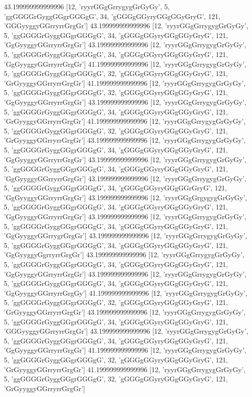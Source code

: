 43.199999999999996 [12, 'ryyrGGgGrrygygGrGyGy', 5, 'ggGGGGrGyggGGgrGGGgG', 34, 'gGGGgGGyryGGgGGyGryG', 121, 'GGGyyggyGGrryrrGrgGr']
43.199999999999996 [12, 'ryyrGGgGrrygygGrGyGy', 5, 'ggGGGGrGyggGGgrGGGgG', 34, 'gGGGgGGyryGGgGGyGryG', 121, 'GgGyyggyGGrryrrGrgGr']
43.199999999999996 [12, 'ryyrGGgGrrygygGrGyGy', 5, 'ggGGGGrGyggGGgrGGGgG', 34, 'gGGGgGGyryGGgGGyGryG', 121, 'GgGyyggyGGrryrrGrgGr']
41.199999999999996 [12, 'ryyrGGgGrrygygGrGyGy', 5, 'ggGGGGrGyggGGgrGGGgG', 32, 'gGGGgGGyryGGgGGyGryG', 121, 'GrGyyggyGGrryrrGrgGr']
41.199999999999996 [12, 'ryyrGGgGrrygygGrGyGy', 5, 'ggGGGGrGyggGGgrGGGgG', 32, 'gGGGgGGyryGGgGGyGryG', 121, 'GgGyyggyGGrryrrGrgGr']
43.199999999999996 [12, 'ryyrGGgGrrygygGrGyGy', 5, 'ggGGGGrGyggGGgrGGGgG', 34, 'gGGGgGGyryGGgGGyGryG', 121, 'GrGyyggyGGrryrrGrgGr']
41.199999999999996 [12, 'ryyrGGgGrrygygGrGyGy', 5, 'ggGGGGrGyggGGgrGGGgG', 32, 'gGGGgGGyryGGgGGyGryG', 121, 'GrGyyggyGGrryrrGrgGr']
43.199999999999996 [12, 'ryyrGGgGrrygygGrGyGy', 5, 'ggGGGGrGyggGGgrGGGgG', 34, 'gGGGgGGyryGGgGGyGryG', 121, 'GgGyyggyGGrryrrGrgGr']
43.199999999999996 [12, 'ryyrGGgGrrygygGrGyGy', 5, 'ggGGGGrGyggGGgrGGGgG', 34, 'gGGGgGGyryGGgGGyGryG', 121, 'GgGyyggyGGrryrrGrgGr']
43.199999999999996 [12, 'ryyrGGgGrrygygGrGyGy', 5, 'ggGGGGrGyggGGgrGGGgG', 34, 'gGGGgGGyryGGgGGrGryG', 121, 'GgGyyggyGGrryrrGrgGr']
43.199999999999996 [12, 'ryyrGGgGrgygygGrGyGy', 5, 'ggGGGGrGyggGGgrGGGgG', 34, 'gGGGgGGyryGGgGGyGryG', 121, 'GgGyyggyGGrryrrGrgGr']
43.199999999999996 [12, 'ryyrGGgGrrygygGrGyGy', 5, 'ggGGGGrGyggGGgrGGGgG', 34, 'gGGGgGGyryGGgGGyGryG', 121, 'GgGyyggyGGrrygrGrgGr']
43.199999999999996 [12, 'ryyrGGgGrrygygGrGyGy', 5, 'ggGGGGrGyggGGgrGGGgG', 34, 'gGGGgGGyryGGgGGyGryG', 121, 'GgGyyggyGgrryrrGrgGr']
43.199999999999996 [12, 'ryyrGGgGrrygygGrGyGy', 5, 'ggGGGGrGyggGGgrGGGgG', 34, 'gGGGgGGyryGGgGGyGryG', 121, 'GgGyyggyGGrryrrGrgGr']
43.199999999999996 [12, 'ryyrGGgGrrygygGrGyGy', 5, 'ggGGGGrGyggGGgrGGGgG', 34, 'gGGGgGGyryGGgGGyGryG', 121, 'GgGyyggyGGrryrrGrgGy']
41.199999999999996 [12, 'ryyrGGgGrrygygGrGyGy', 5, 'ggGGGGrGyggGGgrGGGgG', 32, 'gGGGgGGyryGGgGGyGryG', 121, 'GrGyyggyGGrryrrGrgGr']
43.199999999999996 [12, 'ryyrGGgGrrygygGrGyGy', 5, 'ggGGGGrGyggGGgrGGGgG', 34, 'gGGGgGGyryGGgGGyGryG', 121, 'GGGyyggyGGrryrrGrgGr']
43.199999999999996 [12, 'ryyrGGgGrrygygGrGyGy', 5, 'ggGGGGrGyggGGgrGGGgG', 34, 'gGGGgGGyryGGgGGyGryG', 121, 'GgGyyggyGGrryrrGrgGr']
41.199999999999996 [12, 'ryyrGGgGrrygygGrGyGy', 5, 'ggGGGGrGyggGGgrGGGgG', 32, 'gGGGgGGyryGGgGGyGryG', 121, 'GrGyyggyGGrryrrGrgGr']
41.199999999999996 [12, 'ryyrGGgGrrygygGrGyGy', 5, 'ggGGGGrGyggGGgrGGGgG', 32, 'gGGGgGGyryGGgGGyGryG', 121, 'GrGyyggyGGrryrrGrgGr']
